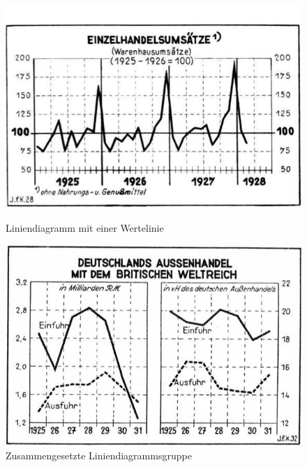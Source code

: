 \begin{figure}[h!] %
    \centering
    \begin{minipage}{0.475\textwidth} %
        \centering
        \includegraphics[width=\linewidth]{Methodik/img/linebank_single.png}
        \caption{ Liniendiagramm mit einer Wertelinie}
        \label{fig:linebank_single}
    \end{minipage}\hfill %
    \begin{minipage}{0.475\textwidth} %
        \centering
        \includegraphics[width=\linewidth]{Methodik/img/linebank_composite.png}
        \caption{ Zusammengesetzte Liniendiagrammsgruppe}
        \label{fig:linebank_composite}
    \end{minipage}


\end{figure}
